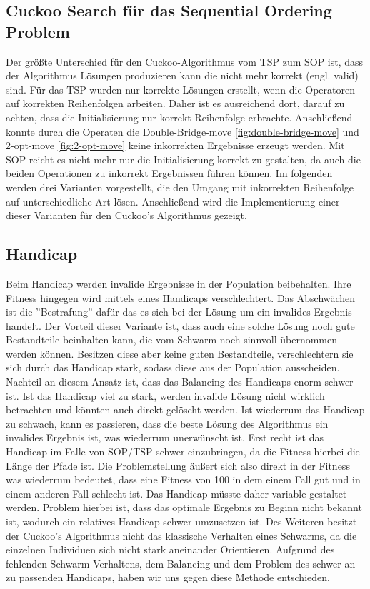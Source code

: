 \documentclass[conference]{IEEEtran}
\begin{document}
    \subsection{Cuckoo Search für das Sequential Ordering Problem}
      Der größte Unterschied für den Cuckoo-Algorithmus vom TSP zum SOP ist, dass der Algorithmus Lösungen 
      produzieren kann die nicht mehr korrekt (engl. valid) sind. Für das TSP wurden nur korrekte Lösungen erstellt, wenn die 
      Operatoren auf korrekten Reihenfolgen arbeiten. Daher ist es ausreichend dort, darauf zu achten, dass die Initialisierung 
      nur korrekt Reihenfolge erbrachte. Anschließend konnte durch die Operaten die Double-Bridge-move 
      \ref{fig:double-bridge-move} und 2-opt-move \ref{fig:2-opt-move} keine inkorrekten Ergebnisse erzeugt werden.
      Mit SOP reicht es nicht mehr nur die Initialisierung korrekt zu gestalten, da auch die 
      beiden Operationen zu inkorrekt Ergebnissen führen können.
      Im folgenden werden drei Varianten vorgestellt, die den Umgang mit inkorrekten Reihenfolge auf unterschiedliche
      Art lösen. Anschließend wird die Implementierung einer dieser Varianten für den Cuckoo's Algorithmus gezeigt. 

    \subsection{Handicap}
      Beim Handicap werden invalide 
      Ergebnisse in der Population beibehalten. Ihre Fitness hingegen wird mittels eines Handicaps 
      verschlechtert. Das Abschwächen ist die ''Bestrafung'' dafür das es sich bei der 
      Lösung um ein invalides Ergebnis handelt. Der Vorteil dieser Variante ist, dass auch eine solche 
      Lösung noch gute Bestandteile beinhalten kann, die vom Schwarm noch sinnvoll übernommen werden können. 
      Besitzen diese aber keine guten Bestandteile, verschlechtern sie sich durch das Handicap stark, sodass diese aus der
      Population ausscheiden. Nachteil an diesem Ansatz ist, dass das Balancing des Handicaps 
      enorm schwer ist. Ist das Handicap viel zu stark, werden invalide Lösung nicht wirklich 
      betrachten und könnten auch direkt gelöscht werden. Ist wiederrum das Handicap zu schwach, 
      kann es passieren, dass die beste Lösung des Algorithmus ein invalides Ergebnis ist, was 
      wiederrum unerwünscht ist. Erst recht ist das Handicap im Falle von SOP/TSP schwer 
      einzubringen, da die Fitness hierbei die Länge der Pfade ist. Die Problemstellung äußert 
      sich also direkt in der Fitness was wiederrum bedeutet, dass eine Fitness von 100 in dem einem Fall
      gut und in einem anderen Fall schlecht ist. Das Handicap müsste daher variable gestaltet werden. Problem hierbei ist, dass das optimale Ergebnis zu Beginn nicht 
      bekannt ist, wodurch ein relatives Handicap schwer umzusetzen ist. Des Weiteren besitzt der Cuckoo's Algorithmus
      nicht das klassische Verhalten eines Schwarms, da die einzelnen Individuen sich nicht stark aneinander Orientieren.
      Aufgrund des fehlenden Schwarm-Verhaltens, dem Balancing und dem Problem des schwer an zu passenden Handicaps, 
      haben wir uns gegen diese Methode entschieden.
\end{document}
